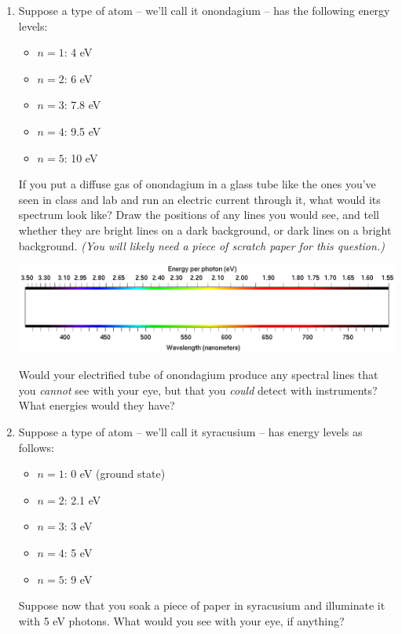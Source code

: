 \documentclass[12pt]{article}
\begin{document}
	\begin{enumerate}
		
		
		\item Suppose a type of atom -- we'll call it onondagium -- has the following energy levels:
		\begin{itemize}
			\item $n=1$: 4 eV
			\item $n=2$: 6 eV
			\item $n=3$: 7.8 eV
			\item $n=4$: 9.5 eV
			\item $n=5$: 10 eV
		\end{itemize}
		
		If you put a diffuse gas of onondagium in a glass tube like the ones you've seen in class and lab and run an electric current through it, what would its spectrum look like? Draw the positions of any lines you would see, and tell whether they are bright lines on a dark background, or dark lines on a bright background. {\it (You will likely need a piece of scratch paper for this question.)}
		
		\includegraphics[width=7in]{spectrum-blank.png}
		\vspace{1in}
		
		Would your electrified tube of onondagium produce any spectral lines that you {\it cannot} see with your eye, but that you {\it could} detect with instruments? What energies would they have?
		
		\newpage
		
		
		\item Suppose a type of atom -- we'll call it syracusium -- has energy levels as follows:
		\begin{itemize}
			\item $n=1$: 0 eV (ground state)
			\item $n=2$: 2.1 eV
			\item $n=3$: 3 eV
			\item $n=4$: 5 eV
			\item $n=5$: 9 eV
		\end{itemize}
		
		Suppose now that you soak a piece of paper in syracusium and illuminate it with 5 eV photons. What would you see with your eye, if anything? 
		

\end{enumerate}
\end{document}
